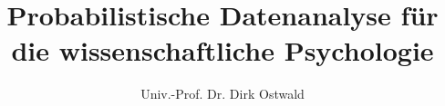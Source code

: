 %
%
%
%
%

\title{\huge  Probabilistische Datenanalyse für die wissenschaftliche Psychologie}
\author{\large  Univ.-Prof. Dr. Dirk Ostwald}
\date{}


